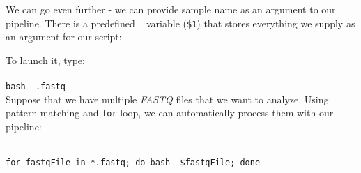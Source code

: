 
%

We can go even further - we can provide sample name as an argument
to our pipeline. There is a predefined \bash~ variable (\texttt{\$1})
that stores everything we supply as an argument for our script:



To launch it, type:\\~\\
\texttt{bash \pipename~\mapReads.fastq}\\

Suppose that we have multiple \textit{FASTQ} files that we want to analyze.
Using pattern matching and \texttt{for} loop, we can automatically process them with our pipeline:\\~\\
\begin{samepage}
\texttt{for~fastqFile~in~*.fastq;~do~bash~\pipename~\$fastqFile;~done}
\end{samepage}

